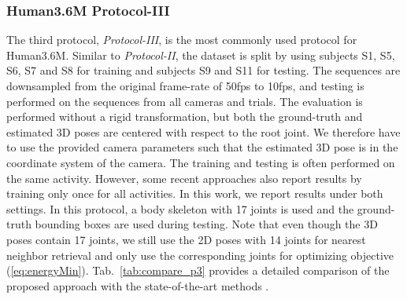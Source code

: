 \documentclass[10pt,journal,compsoc]{IEEEtran}
\begin{document}
\subsubsection{Human3.6M Protocol-III}
The third protocol, \emph{Protocol-III}, is the most commonly used protocol for Human3.6M. Similar to 
\emph{Protocol-II}, the dataset is split by using subjects S1, S5, S6, S7 and S8 for training and subjects S9 
and S11 for testing. The sequences are downsampled from the original frame-rate of 50fps to 10fps, and testing is 
performed on the sequences from all cameras and trials. The evaluation is performed without a rigid transformation, but both the ground-truth and estimated 3D poses are centered with respect to the root joint. We therefore have to use the provided camera parameters such that the estimated 3D pose is in the coordinate system of the camera. 
The training and testing is often performed on the same activity. However, some recent approaches also report results by training
only once for all activities. In this work, we report results under both settings. In this protocol, a body skeleton
with 17 joints is used and the ground-truth bounding boxes are used during testing. Note that even though the 3D poses
contain 17 joints, we still use the 2D poses with 14 joints for nearest neighbor retrieval and only use the corresponding 
joints for optimizing objective (\ref{eq:energyMin}).  Tab.~\ref{tab:compare_p3}
provides a detailed comparison of the proposed approach with the state-of-the-art methods 
\cite{h36m_pami, LiC14, tekin2015predicting, tekin2016structured, zhou2016sparseness, zhou2016deep, sanzari2016bayesian, tome2017lifting, Moreno_arxiv2016, chen2017matching}.  \\
\end{document}
